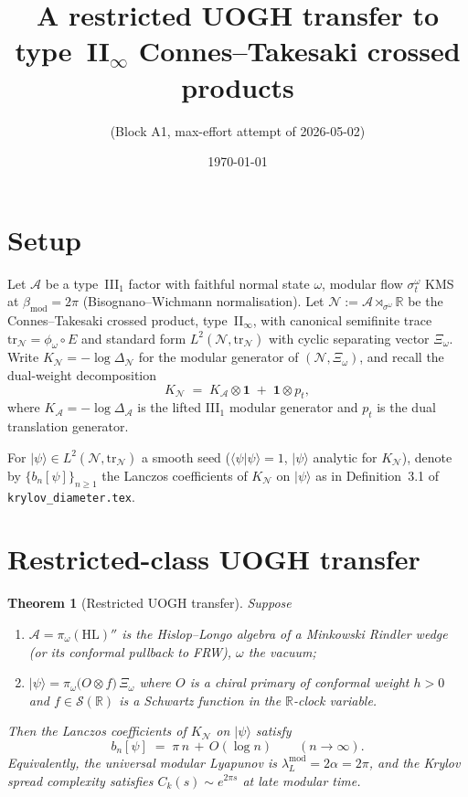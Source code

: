 \documentclass[11pt]{amsart}
\title{A restricted UOGH transfer to type~II$_\infty$ Connes--Takesaki crossed products}
\author{(Block A1, max-effort attempt of 2026-05-02)}
\date{\today}
\newtheorem{theorem}{Theorem}[section]
\theoremstyle{remark}
\newcommand{\NN}{\mathcal{N}}
\newcommand{\AA}{\mathcal{A}}
\newcommand{\R}{\mathbb{R}}
\begin{document}
\maketitle

\section{Setup}

Let $\AA$ be a type~III$_1$ factor with faithful normal state $\omega$,
modular flow $\sigma_t^\omega$ KMS at $\beta_{\mathrm{mod}}=2\pi$
(Bisognano--Wichmann normalisation). Let
\(
\NN := \AA \rtimes_{\sigma^\omega} \R
\)
be the Connes--Takesaki crossed product, type~II$_\infty$, with canonical
semifinite trace $\mathrm{tr}_\NN=\phi_\omega\circ E$ and standard form
$L^2(\NN,\mathrm{tr}_\NN)$ with cyclic separating vector $\Xi_\omega$.
Write $K_\NN=-\log\Delta_\NN$ for the modular generator of
$(\NN,\Xi_\omega)$, and recall the dual-weight decomposition
\[
   K_\NN \;=\; K_\AA \otimes \mathbf 1 \;+\; \mathbf 1 \otimes p_t,
\]
where $K_\AA=-\log\Delta_\AA$ is the lifted III$_1$ modular generator and
$p_t$ is the dual translation generator.

For $|\psi\rangle\in L^2(\NN,\mathrm{tr}_\NN)$ a smooth seed
($\langle\psi|\psi\rangle=1$, $|\psi\rangle$ analytic for $K_\NN$),
denote by $\{b_n[\psi]\}_{n\ge 1}$ the Lanczos coefficients of $K_\NN$
on $|\psi\rangle$ as in Definition~3.1 of \texttt{krylov\_diameter.tex}.

\section{Restricted-class UOGH transfer}

\begin{theorem}[Restricted UOGH transfer]\label{thm:restricted-uogh}
Suppose
\begin{enumerate}
\item[\rm(i)] $\AA = \pi_\omega(\mathrm{HL})''$ is the Hislop--Longo
algebra of a Minkowski Rindler wedge (or its conformal pullback to FRW),
$\omega$ the vacuum;
\item[\rm(ii)] $|\psi\rangle = \pi_\omega\!\big(O\otimes f\big)\,\Xi_\omega$
where $O$ is a chiral primary of conformal weight $h>0$ and
$f\in\mathcal S(\R)$ is a Schwartz function in the $\R$-clock variable.
\end{enumerate}
Then the Lanczos coefficients of $K_\NN$ on $|\psi\rangle$ satisfy
\begin{equation}\label{eq:bn-asymp}
b_n[\psi] \;=\; \pi\,n \,+\, O(\log n)
\qquad (n\to\infty).
\end{equation}
Equivalently, the universal modular Lyapunov is
$\lambda_L^{\mathrm{mod}}=2\alpha=2\pi$, and the Krylov spread
complexity satisfies $C_k(s)\sim e^{2\pi s}$ at late modular time.
\end{theorem}
\end{document}
